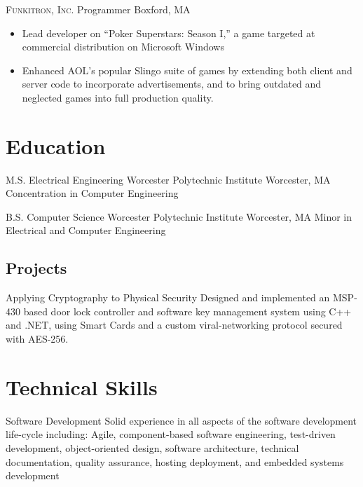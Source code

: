 \documentclass[11pt,letterpaper,roman]{moderncv} %
\begin{document}
		{\textsc{Funkitron, Inc.}}				{Programmer}							{Boxford, MA}		{}
	{
	\begin{itemize}
		\item Lead developer on ``Poker Superstars: Season I,'' a game targeted at commercial distribution on Microsoft Windows
		\item Enhanced AOL's popular Slingo suite of games by extending both client and server code to incorporate advertisements, and to bring outdated and neglected games into full production quality.
	\end{itemize}
	}


\section{Education}

		{M.S. Electrical Engineering}	{Worcester Polytechnic Institute}	{Worcester, MA}		{}
	{
		Concentration in Computer Engineering
	}

		{B.S. Computer Science}			{Worcester Polytechnic Institute}	{Worcester, MA}		{}
	{
		Minor in Electrical and Computer Engineering
	}

\subsection{Projects}

		{Applying Cryptography to Physical Security}										{}{}{}
	{
		Designed and implemented an MSP-430 based door lock controller and software key management system using C++ and .NET, using Smart Cards and a custom viral-networking protocol secured with AES-256.
	}


\section{Technical Skills}

	\cvitem
	{Software Development}
	{
		Solid experience in all aspects of the software development life-cycle including: Agile, component-based software engineering, test-driven development, object-oriented design, software architecture, technical documentation, quality assurance, hosting deployment, and embedded systems development
	}
\end{document}
